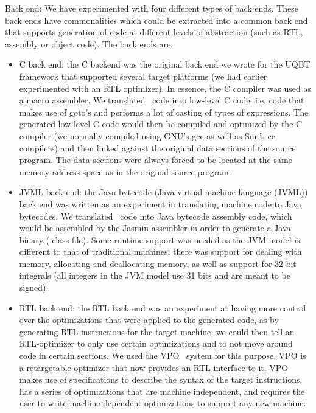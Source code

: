 \begin{description}
\item Back end: 
We have experimented with four different types of back ends.  These 
back ends have commonalities which could be extracted into a common 
back end that supports generation of code at different levels of 
abstraction (such as RTL, assembly or object code).  The back ends are:  

\begin{itemize}
\item C back end: the C backend was the original back end we wrote 
	for the UQBT framework that supported several target platforms 
	(we had earlier experimented with an RTL optimizer).  
	In essence, the C compiler was used as a macro assembler.  
	We translated \hrtl\ code into low-level C code; 
	i.e. code that makes use of goto's and performs a lot of casting 
	of types of expressions.  The generated low-level C code would then 
	be compiled and optimized by the C compiler (we normally compiled 
	using GNU's gcc as well as Sun's cc compilers) and then linked 
	against the original data sections of the source program.  The data 
	sections were always forced to be located at the same memory address 
	space as in the original source program.  

\item JVML back end: the Java bytecode (Java virtual machine language (JVML)) 
	back end was written as an experiment in translating machine code to 
	Java bytecodes.  We translated \hrtl\ code into Java bytecode assembly 
	code, which would be assembled by the Jasmin assembler in order to 
	generate a Java binary (.class file).  Some runtime support was needed 
	as the JVM model is different to that of traditional machines; there 
	was support for dealing with memory, allocating and deallocating memory, 
	as well as support for 32-bit integrals (all integers in the JVM model 
	use 31 bits and are meant to be signed).

\item RTL back end: the RTL back end was an experiment at having more 
	control over the optimizations that were applied to the generated 
	code, as by generating RTL instructions for the target machine, 
	we could then tell an RTL-optimizer to only use certain optimizations 
	and to not move around code in certain sections.   We used the 
	VPO~\cite{Beni88} system for this purpose.  VPO is a retargetable 
	optimizer that now provides an RTL interface to it.  VPO makes use 
	of specifications to describe the syntax of the target instructions, 
	has a series of optimizations that are machine independent, and 
	requires the user to write machine dependent optimizations to support 
	any new machine.  


\end{itemize}
\end{description}
